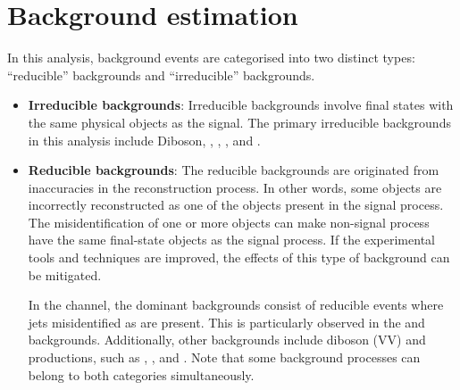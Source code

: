 \section{Background estimation}
\label{sec:ChaptH:Bkg}
In this analysis, background events are categorised into two distinct types:  
``reducible'' backgrounds and ``irreducible'' backgrounds.
\begin{itemize}
	\item \textbf{Irreducible backgrounds}: Irreducible backgrounds involve final states 
	with the same physical objects as the signal. The primary irreducible backgrounds
		 in this analysis include Diboson, \tW, \ttZ, \ttH, \ttW and \tZq.
	\item \textbf{Reducible backgrounds}:  The reducible backgrounds 
		are originated from inaccuracies in the reconstruction process. In other words,
		some objects are incorrectly reconstructed as one of the objects present in the signal process.
		The misidentification of one or more objects can make non-signal process have
		the same final-state objects as the signal process. 
		If the experimental tools and techniques are improved, the effects of this type of background
		can be mitigated.
		
		In the \dileptau channel, the dominant backgrounds consist of reducible events 
		where jets misidentified as \tauhad are present. This is particularly observed in 
		the \ttbar and \Zjets backgrounds. Additionally, other backgrounds include
		diboson (VV) and \ttX productions, such 
		as \ttH, \ttZ, and \ttW. Note that some background processes can belong to both categories
		simultaneously.  
		
\end{itemize}

